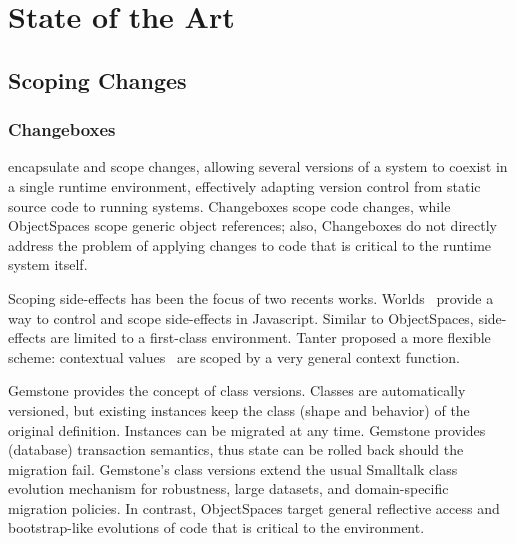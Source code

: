 
\chapter{State of the Art}
\minitoc
\introduction
	
	
\newpage
\section{Scoping Changes}

\subsection*{Changeboxes} \cite{Denk07c} encapsulate and scope changes, allowing several versions of a system to coexist in a single runtime environment, effectively adapting version control from static source code to running systems. Changeboxes scope code changes, while ObjectSpaces scope generic object references; also, Changeboxes do not directly address the problem of applying changes to code that is critical to the runtime system itself.

Scoping side-effects has been the focus of two recents works. Worlds~\cite{Wart08a} provide a way to control and scope side-effects in Javascript. Similar to
ObjectSpaces, side-effects are limited to a first-class environment.  Tanter proposed a more flexible scheme: contextual values~\cite{Tant08b} are scoped 
by a very general context function.

Gemstone \cite{Otis91a} provides the concept of class versions. Classes are
automatically versioned, but existing instances keep the class (shape and
behavior) of the original definition. Instances can be migrated at any time.
Gemstone provides (database) transaction semantics, thus state can be rolled
back should the migration fail.
Gemstone's class versions extend the usual Smalltalk class evolution mechanism for robustness, 
large datasets, and domain-specific migration policies. In contrast, ObjectSpaces target general 
reflective access and bootstrap-like evolutions of code that is critical to the environment.

